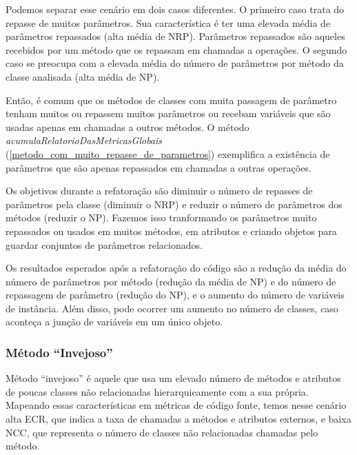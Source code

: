 	Podemos separar esse cenário em dois casos diferentes. O primeiro caso trata do repasse de muitos parâmetros. Sua característica é ter uma elevada média de parâmetros repassados (alta média de NRP). Parâmetros repassados são aqueles recebidos por um método que os repassam em chamadas a operações. O segundo caso se preocupa com a elevada média do número de parâmetros por método da classe analisada (alta média de NP).       
		     
	Então, é comum que os métodos de classes com muita passagem de parâmetro tenham muitos ou repassem muitos parâmetros ou recebam variáveis que são usadas apenas em chamadas a outros métodos.	O método \textit{acumulaRelatorioDasMetricasGlobais} (\ref{metodo_com_muito_repasse_de_parametros}) exemplifica a existência de parâmetros que são apenas repassados em chamadas a outras operações.
	                                                               
                                     
	
	Os objetivos durante a refatoração são diminuir o número de repasses de parâmetros pela classe (diminuir o NRP) e reduzir o número de parâmetros dos métodos (reduzir o NP). Fazemos isso tranformando os parâmetros muito repassados ou usados em muitos métodos, em atributos e criando objetos para guardar conjuntos de parâmetros relacionados.
	
	Os resultados esperados após a refatoração do código são a redução da média do número de parâmetros por método (redução da média de NP) e do número de repassagem de parâmetro (redução do NP), e o aumento do número de variáveis de instância. Além disso, pode ocorrer um aumento no número de classes, caso aconteça a junção de variáveis em um único objeto.	           


\subsubsection{Método ``Invejoso''}
	
	Método ``invejoso'' é aquele que usa um elevado número de métodos e atributos de poucas classes não relacionadas hierarquicamente com a sua própria. Mapeando essas características em métricas de código fonte, temos nesse cenário alta ECR, que indica a taxa de chamadas a métodos e atributos externos, e baixa NCC, que representa o número de classes não relacionadas chamadas pelo método.
	
